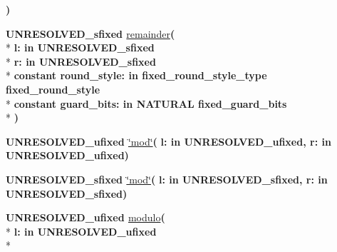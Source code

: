 \begin{DoxyCompactItemize}
{\bfseries  )} 
\item 
{\bfseries {\bfseries \textcolor{vhdlchar}{U\+N\+R\+E\+S\+O\+L\+V\+E\+D\+\_\+sfixed}\textcolor{vhdlchar}{ }}} \hyperlink{class__fixed__pkg_a60e9ec39e9203cde6cec6fed45bf984a}{remainder}{\bfseries  ( }\\*
{\bfseries \textcolor{vhdlchar}{l\+: }\textcolor{stringliteral}{in }\textcolor{vhdlchar}{U\+N\+R\+E\+S\+O\+L\+V\+E\+D\+\_\+sfixed}}\\*
{\bfseries \textcolor{vhdlchar}{r\+: }\textcolor{stringliteral}{in }\textcolor{vhdlchar}{U\+N\+R\+E\+S\+O\+L\+V\+E\+D\+\_\+sfixed}}\\*
{\bfseries {\bfseries \textcolor{keywordflow}{constant}\textcolor{vhdlchar}{ }}\textcolor{vhdlchar}{round\+\_\+style\+: }\textcolor{stringliteral}{in }\textcolor{vhdlchar}{fixed\+\_\+round\+\_\+style\+\_\+type     fixed\+\_\+round\+\_\+style}}\\*
{\bfseries {\bfseries \textcolor{keywordflow}{constant}\textcolor{vhdlchar}{ }}\textcolor{vhdlchar}{guard\+\_\+bits\+: }\textcolor{stringliteral}{in }\textcolor{vhdlchar}{N\+A\+T\+U\+R\+A\+L     fixed\+\_\+guard\+\_\+bits}}\\*
{\bfseries  )} 
\item 
{\bfseries {\bfseries \textcolor{vhdlchar}{U\+N\+R\+E\+S\+O\+L\+V\+E\+D\+\_\+ufixed}\textcolor{vhdlchar}{ }}} \hyperlink{class__fixed__pkg_a2325680210a988617a0735f076a274b6}{\char`\"{}mod\char`\"{}}{\bfseries  ( }{\bfseries \textcolor{vhdlchar}{l\+: }\textcolor{stringliteral}{in }\textcolor{vhdlchar}{U\+N\+R\+E\+S\+O\+L\+V\+E\+D\+\_\+ufixed}}{\bfseries  , \textcolor{vhdlchar}{r\+: }\textcolor{stringliteral}{in }\textcolor{vhdlchar}{U\+N\+R\+E\+S\+O\+L\+V\+E\+D\+\_\+ufixed}}{\bfseries  )} 
\item 
{\bfseries {\bfseries \textcolor{vhdlchar}{U\+N\+R\+E\+S\+O\+L\+V\+E\+D\+\_\+sfixed}\textcolor{vhdlchar}{ }}} \hyperlink{class__fixed__pkg_a58efbda541d57d3b818c74b97123dc5b}{\char`\"{}mod\char`\"{}}{\bfseries  ( }{\bfseries \textcolor{vhdlchar}{l\+: }\textcolor{stringliteral}{in }\textcolor{vhdlchar}{U\+N\+R\+E\+S\+O\+L\+V\+E\+D\+\_\+sfixed}}{\bfseries  , \textcolor{vhdlchar}{r\+: }\textcolor{stringliteral}{in }\textcolor{vhdlchar}{U\+N\+R\+E\+S\+O\+L\+V\+E\+D\+\_\+sfixed}}{\bfseries  )} 
\item 
{\bfseries {\bfseries \textcolor{vhdlchar}{U\+N\+R\+E\+S\+O\+L\+V\+E\+D\+\_\+ufixed}\textcolor{vhdlchar}{ }}} \hyperlink{class__fixed__pkg_a5cff73edac1a7495ca003bf5dfebf12b}{modulo}{\bfseries  ( }\\*
{\bfseries \textcolor{vhdlchar}{l\+: }\textcolor{stringliteral}{in }\textcolor{vhdlchar}{U\+N\+R\+E\+S\+O\+L\+V\+E\+D\+\_\+ufixed}}\\*

\end{DoxyCompactItemize}
